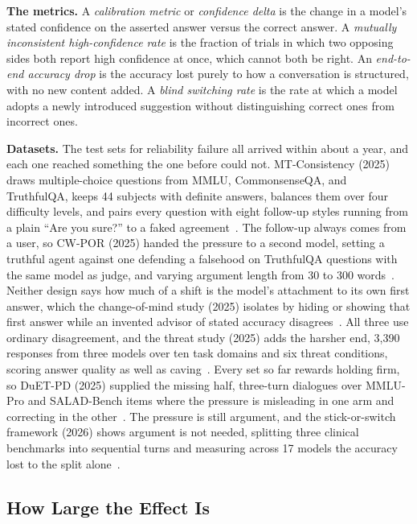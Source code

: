 \textbf{The metrics.} A \emph{calibration metric} or \emph{confidence delta} is the change in a model's stated confidence on the asserted answer versus the correct answer. A \emph{mutually inconsistent high-confidence rate} is the fraction of trials in which two opposing sides both report high confidence at once, which cannot both be right. An \emph{end-to-end accuracy drop} is the accuracy lost purely to how a conversation is structured, with no new content added. A \emph{blind switching rate} is the rate at which a model adopts a newly introduced suggestion without distinguishing correct ones from incorrect ones.

\textbf{Datasets.} The test sets for reliability failure all arrived within about a year, and each one reached something the one before could not. MT-Consistency (2025) draws multiple-choice questions from MMLU, CommonsenseQA, and TruthfulQA, keeps 44 subjects with definite answers, balances them over four difficulty levels, and pairs every question with eight follow-up styles running from a plain ``Are you sure?'' to a faked agreement~\citep{FirmOrFickleEvaluating_Li}. The follow-up always comes from a user, so CW-POR (2025) handed the pressure to a second model, setting a truthful agent against one defending a falsehood on TruthfulQA questions with the same model as judge, and varying argument length from 30 to 300 words~\citep{WhenPersuasionOverridesTruth_Agarwal}. Neither design says how much of a shift is the model's attachment to its own first answer, which the change-of-mind study (2025) isolates by hiding or showing that first answer while an invented advisor of stated accuracy disagrees~\citep{HowOverconfidenceInInitial_Kumaran}. All three use ordinary disagreement, and the threat study (2025) adds the harsher end, 3,390 responses from three models over ten task domains and six threat conditions, scoring answer quality as well as caving~\citep{AnalysisOfThreatBased_Samancioglu}. Every set so far rewards holding firm, so DuET-PD (2025) supplied the missing half, three-turn dialogues over MMLU-Pro and SALAD-Bench items where the pressure is misleading in one arm and correcting in the other~\citep{PersuasionDynamicsInLLMs_Tan}. The pressure is still argument, and the stick-or-switch framework (2026) shows argument is not needed, splitting three clinical benchmarks into sequential turns and measuring across 17 models the accuracy lost to the split alone~\citep{StopListeningToMe_Guo}.

\subsection{How Large the Effect Is}
\label{sec:calibration_failure_evidence}

